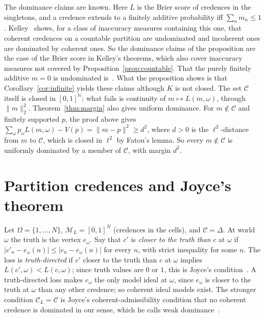 \documentclass[11pt]{article}
\theoremstyle{definition}
\theoremstyle{remark}
\newcommand{\M}{\mathcal M}
\newcommand{\C}{\mathcal C}
\begin{document}
The dominance claims are known. Here $L$ is the Brier score of credences in the singletons, and a credence extends to a finitely additive probability iff $\sum_nm_n\le1$. Kelley~\cite[Theorems 3.4 and 4.26]{Kelley} shows, for a class of inaccuracy measures containing this one, that coherent credences on a countable partition are undominated and incoherent ones are dominated by coherent ones. So the dominance claims of the proposition are the case of the Brier score in Kelley's theorems, which also cover inaccuracy measures not covered by Proposition~\ref{prop:countable}. That the purely finitely additive $m=0$ is undominated is~\cite[Example~3]{SSK14}. What the proposition shows is that Corollary~\ref{cor:infinite} yields these claims although $K$ is not closed. The set $\C$ itself is closed in $[0,1]^{\mathbb N}$; what fails is continuity of $m\mapsto L(m,\omega)$, through $\|m\|_2^2$. Theorem~\ref{thm:margin} also gives uniform dominance. For $m\notin\C$ and finitely supported $p$, the proof above gives $\sum_\omega p_\omega L(m,\omega)-V(p)=\|m-p\|^2\ge d^2$, where $d>0$ is the $\ell^2$-distance from $m$ to $\C$, which is closed in $\ell^2$ by Fatou's lemma. So every $m\notin\C$ is uniformly dominated by a member of $\C$, with margin $d^2$.


\section{Partition credences and Joyce's theorem}\label{sec:joyce}
Let $\Omega=\{1,\dots,N\}$, $\M_L=[0,1]^N$ (credences in the cells), and $\C=\Delta$. At world $\omega$ the truth is the vertex $e_\omega$. Say that $c'$ is \emph{closer to the truth than} $c$ at $\omega$ if $|c'_n-e_\omega(n)|\le|c_n-e_\omega(n)|$ for every $n$, with strict inequality for some $n$. The loss is \emph{truth-directed} if $c'$ closer to the truth than $c$ at $\omega$ implies $L(c',\omega)<L(c,\omega)$; since truth values are $0$ or $1$, this is Joyce's condition~\cite[p.~269]{Joyce}. A truth-directed loss makes $e_\omega$ the only model ideal at $\omega$, since $e_\omega$ is closer to the truth at $\omega$ than any other credence; so coherent ideal models exist. The stronger condition $\C_L=\C$ is Joyce's coherent-admissibility condition that no coherent credence is dominated in our sense, which he calls weak dominance~\cite[pp.~267, 280]{Joyce}.
\end{document}
